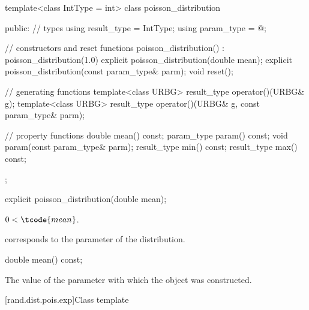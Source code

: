 %
%
\begin{codeblock}
template<class IntType = int>
  class poisson_distribution
  {
  public:
    // types
    using result_type = IntType;
    using param_type  = @\unspec@;

    // constructors and reset functions
    poisson_distribution() : poisson_distribution(1.0) {}
    explicit poisson_distribution(double mean);
    explicit poisson_distribution(const param_type& parm);
    void reset();

    // generating functions
    template<class URBG>
      result_type operator()(URBG& g);
    template<class URBG>
      result_type operator()(URBG& g, const param_type& parm);

    // property functions
    double mean() const;
    param_type param() const;
    void param(const param_type& parm);
    result_type min() const;
    result_type max() const;
  };
\end{codeblock}

%
\begin{itemdecl}
explicit poisson_distribution(double mean);
\end{itemdecl}

\begin{itemdescr}
\pnum
\expects
$0 < \tcode{mean}$.

\pnum
\remarks
{} corresponds to the parameter of the distribution.
\end{itemdescr}

\begin{indexed}{}
\begin{itemdecl}
double mean() const;
\end{itemdecl}
\end{indexed}

\begin{itemdescr}
\pnum
\returns
The value of the  parameter
 with which the object was constructed.
\end{itemdescr}


[rand.dist.pois.exp]{Class template }%
%
%


